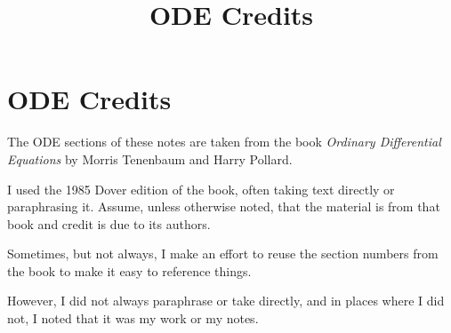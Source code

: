 \documentclass{article}
\title{ODE Credits}
\begin{document}
\section{ODE Credits}

The ODE sections of these notes are taken from the book \emph{Ordinary Differential Equations} by Morris Tenenbaum and Harry Pollard.

I used the 1985 Dover edition of the book, often taking text directly or paraphrasing it. Assume, unless otherwise noted, that the material is from that book and credit is due to its authors.

Sometimes, but not always, I make an effort to reuse the section numbers from the book to make it easy to reference things.

However, I did not always paraphrase or take directly, and in places where I did not, I noted that it was my work or my notes.
\end{document}
